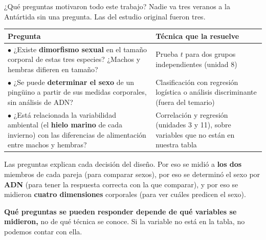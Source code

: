 \documentclass[aspectratio=169,10pt]{beamer}
\newcommand{\destaca}[1]{%
  \par\vspace{3pt}\noindent
  \colorbox{azulClaro}{%
    \parbox{\dimexpr\linewidth-2\fboxsep\relax}{\vspace{3pt}#1\vspace{3pt}}}%
  \par\vspace{3pt}}
\begin{document}
\begin{frame}{¿Qué preguntas motivaron todo este trabajo?}
  Nadie va tres veranos a la Antártida sin una pregunta. Las del estudio original
  fueron tres.

  \vspace{0.15cm}
  \centering
  {\small
  \begin{tabular}{@{}p{7.2cm}p{4.8cm}@{}}
    \toprule
    \textbf{Pregunta} & \textbf{Técnica que la resuelve} \\
    \midrule
    \textcolor[HTML]{1F4E79}{$\bullet$} ¿Existe \textbf{dimorfismo sexual} en el tamaño
    corporal de estas tres especies? ¿Machos y hembras difieren en tamaño? &
      Prueba $t$ para dos grupos independientes {\scriptsize\color{grisT}(unidad 8)} \\
    \textcolor[HTML]{1F4E79}{$\bullet$} ¿Se puede \textbf{determinar el sexo} de un
    pingüino a partir de sus medidas corporales, sin análisis de ADN? &
      Clasificación con regresión logística o análisis discriminante
      {\scriptsize\color{rojoAc}(fuera del temario)} \\
    \textcolor[HTML]{1F4E79}{$\bullet$} ¿Está relacionada la variabilidad ambiental
    (el \textbf{hielo marino} de cada invierno) con las diferencias de alimentación
    entre machos y hembras? &
      Correlación y regresión {\scriptsize\color{grisT}(unidades 3 y 11)}, sobre
      variables que \textcolor{rojoAc}{no están en nuestra tabla} \\
    \bottomrule
  \end{tabular}}

  \vspace{0.15cm}
  \raggedright
  \destaca{\small Las preguntas explican cada decisión del diseño. Por eso se midió a
  \textbf{los dos} miembros de cada pareja (para comparar sexos), por eso se determinó el
  sexo por \textbf{ADN} (para tener la respuesta correcta con la que comparar), y por eso
  se midieron \textbf{cuatro dimensiones} corporales (para ver cuáles predicen el sexo).

  \vspace{3mm}
  \textbf{Qué preguntas se pueden responder depende de qué variables se midieron,} no de
  qué técnica se conoce. Si la variable no está en la tabla, no podemos contar con ella.}
\end{frame}
\end{document}

